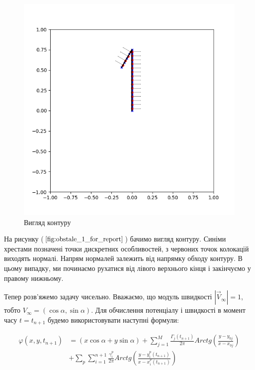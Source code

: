\documentclass[a4paper,12pt]{article}
\begin{document}
	\begin{figure}[ht]
		\begin{center}\includegraphics[scale=0.5]{obstacle_1_for_report} \end{center}
		\caption{Вигляд контуру}
		\label{fig:obstale_1_for_report}
	\end{figure}
	
	На рисунку ($\ref{fig:obstale_1_for_report}$) бачимо вигляд контуру. Синіми хрестами позначені точки дискретних особливостей, з червоних точок колокацій виходять нормалі. Напрям нормалей залежить від напрямку обходу контуру. В цьому випадку, ми починаємо рухатися від лівого верхнього кінця і закінчуємо у правому нижньому.

	Тепер розв'яжемо задачу чисельно. Вважаємо, що модуль швидкості $|\vec{V}_\infty| = 1$, тобто $V_\infty = (\cos{\alpha}, \sin{\alpha})$. Для обчислення потенціалу і швидкості в момент часу $t = t_{n+1}$ будемо використовувати наступні формули:
	\newpage

	\begin{align}
		\varphi(x,y,t_{n+1}) &= (x \cos \alpha + y \sin \alpha) + \sum\limits_{j=1}^{M} \frac{\Gamma_j(t_{n+1})}{2 \pi} Arctg \left(\frac{y - y_{0j}}{x - x_{0j}}\right)  \nonumber \\ &+\sum_p \sum\limits_{i=1}^{n+1} \frac{\gamma_{i}^{p}}{2 \pi} Arctg \left( \frac{ y - y_{i}^{p}(t_{n+1}) }{ x - x_{i}^{p} (t_{n+1}) }\right) \nonumber	
	\end{align}
	
\end{document}
